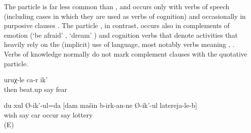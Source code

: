The particle  is far less common than , and occurs only with verbs of speech (including cases in which they are used as verbs of cognition) and occasionally in purposive clauses . The particle , in contrast, occurs also in complements of emotion (`be afraid' , `dream' ) and cognition verbs that denote activities that heavily rely on the (implicit) use of language, most notably verbs meaning  , . Verbs of knowledge normally do not mark complement clauses with the quotative particle.
%
\begin{exe}
	\ex	\label{ex:She is afraid that he will then beat her up}
	\gll	[c'il	ca-r	it-an=da	r-ik'-ul]	uruχ-le	ca-r	ik'\\
		then		beat.up	say	fear		\\
	\glt	{}

	\ex	\label{ex:I dream to win a car in the lottery}
	\gll	du xul Ø-ik'-ul=da [dam mašin b-irk-an-ne Ø-ik'-ul latereja-le-b]\\
		 wish	say		car	occur say lottery\\
	\glt	{} (E)
\end{exe}

